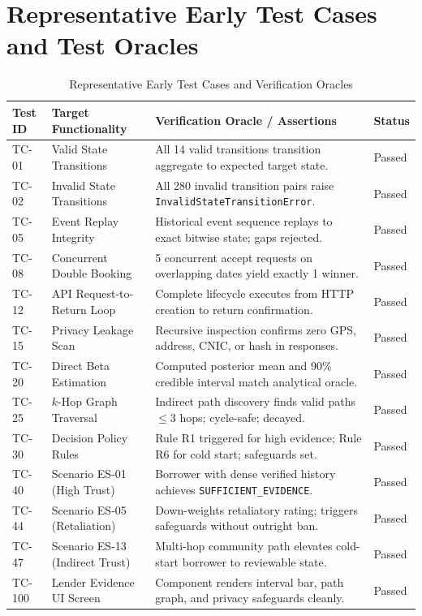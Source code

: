 \section{Representative Early Test Cases and Test Oracles}
\begin{table}[htbp]
\centering
\caption{Representative Early Test Cases and Verification Oracles}
\label{tab:test_cases}
\small
\begin{tabularx}{\textwidth}{l p{4.5cm} p{4.5cm} l}
\toprule
\textbf{Test ID} & \textbf{Target Functionality} & \textbf{Verification Oracle / Assertions} & \textbf{Status} \\
\midrule
TC-01 & Valid State Transitions & All 14 valid transitions transition aggregate to expected target state. & Passed \\
TC-02 & Invalid State Transitions & All 280 invalid transition pairs raise \texttt{InvalidStateTransitionError}. & Passed \\
TC-05 & Event Replay Integrity & Historical event sequence replays to exact bitwise state; gaps rejected. & Passed \\
TC-08 & Concurrent Double Booking & 5 concurrent accept requests on overlapping dates yield exactly 1 winner. & Passed \\
TC-12 & API Request-to-Return Loop & Complete lifecycle executes from HTTP creation to return confirmation. & Passed \\
TC-15 & Privacy Leakage Scan & Recursive inspection confirms zero GPS, address, CNIC, or hash in responses. & Passed \\
TC-20 & Direct Beta Estimation & Computed posterior mean and 90\% credible interval match analytical oracle. & Passed \\
TC-25 & $k$-Hop Graph Traversal & Indirect path discovery finds valid paths $\le 3$ hops; cycle-safe; decayed. & Passed \\
TC-30 & Decision Policy Rules & Rule R1 triggered for high evidence; Rule R6 for cold start; safeguards set. & Passed \\
TC-40 & Scenario ES-01 (High Trust) & Borrower with dense verified history achieves \texttt{SUFFICIENT\_EVIDENCE}. & Passed \\
TC-44 & Scenario ES-05 (Retaliation) & Down-weights retaliatory rating; triggers safeguards without outright ban. & Passed \\
TC-47 & Scenario ES-13 (Indirect Trust) & Multi-hop community path elevates cold-start borrower to reviewable state. & Passed \\
TC-100 & Lender Evidence UI Screen & Component renders interval bar, path graph, and privacy safeguards cleanly. & Passed \\
\bottomrule
\end{tabularx}
\end{table}

